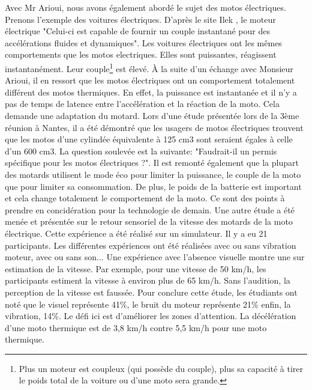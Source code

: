 Avec Mr Arioui, nous avons également abordé le sujet des motos électriques. Prenons l'exemple des voitures électriques.
D'après le site Ilek \cite{voiture_electrique}, le moteur électrique "Celui-ci est capable de fournir un couple instantané pour des accélérations fluides et dynamiques". Les voitures électriques ont les mêmes comportements que les motos electriques. Elles sont puissantes, réagissent instantanément. Leur couple\footnote{Plus un moteur est coupleux (qui possède du couple), plus sa capacité à tirer le poids total de la voiture ou d'une moto sera grande.} est élevé.
À la suite d’un échange avec Monsieur Arioui, il en ressort que les motos électriques ont un comportement totalement différent des motos thermiques. En effet, la puissance est instantanée et il n'y a pas de temps de latence entre l'accélération et la réaction de la moto. Cela demande une adaptation du motard. Lors d'une étude présentée lors de la 3ème réunion \cite{reunionProjet2025} à Nantes, il a été démontré que les usagers de motos électriques trouvent que les motos d'une cylindée équivalente à 125 cm3 sont seraient égales à celle d'un 600 cm3. La question soulevée est la suivante: "Faudrait-il un permis spécifique pour les motos électriques ?". Il est remonté également que la plupart des motards utilisent le mode éco pour limiter la puissance, le couple de la moto que pour limiter sa consommation.
De plus, le poids de la batterie est important et cela change totalement le comportement de la moto. Ce sont des points à prendre en concidération pour la technologie de demain.
Une autre étude a été menée et présentée\cite{reunionProjet2025} sur le retour sensoriel de la vitesse des motards de la moto électrique. Cette expérience a été réalisé sur un simulateur. Il y a eu 21 participants. Les différentes expériences ont été réalisées avec ou sans vibration moteur, avec ou sans son... Une expérience avec l'absence visuelle montre une sur estimation de la vitesse. Par exemple, pour une vitesse de 50 km/h, les participants estiment la vitesse à environ plus de 65 km/h. Sans l'audition, la perception de la vitesse est faussée. Pour conclure cette étude, les étudiants ont noté que le visuel représente 41\%, le bruit du moteur représente 21\% enfin, la vibration, 14\%. Le défi ici est d'améliorer les zones d'attention. La décélération d'une moto thermique est de 3,8 km/h contre 5,5 km/h pour une moto thermique.
\vspace{0.5cm} %

